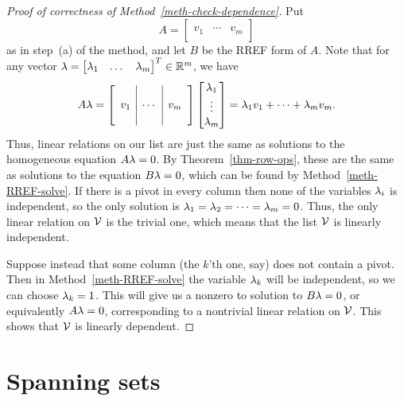 \documentclass[reqno]{amsart}
\theoremstyle{definition}
\begin{document}
\begin{proof}[Proof of correctness of Method~\ref{meth-check-dependence}]
 Put
 \[ A = \left[\begin{array}{c|c|c}
              && \\
              v_1 & \cdots & v_m \\
              &&
        \end{array}\right]
 \]
 as in step~(a) of the method, and let $B$ be the RREF form of $A$.
 Note that for any vector
 $\lambda=\left[\begin{matrix} \lambda_1 & \dotsc & \lambda_m\end{matrix}\right]^T\in{\mathbb{R}}^m$, we have
 \[ A\lambda =
     \left[\begin{array}{c|c|c}
              && \\
              v_1 & \cdots & v_m \\
              &&
     \end{array}\right]
     \left[\begin{matrix} \lambda_1 \\ \vdots \\ \lambda_m \end{matrix}\right] =
     \lambda_1v_1 + \dotsb + \lambda_mv_m.
 \]
 Thus, linear relations on our list are just the same as solutions to
 the homogeneous equation $A\lambda=0$.  By Theorem~\ref{thm-row-ops},
 these are the same as solutions to the equation $B\lambda=0$, which can
 be found by Method~\ref{meth-RREF-solve}.  If there is a pivot in
 every column then none of the variables $\lambda_i$ is independent, so
 the only solution is $\lambda_1=\lambda_2=\dotsb=\lambda_m=0$.  Thus, the only
 linear relation on $\mathcal{V}$ is the trivial one, which means that the
 list $\mathcal{V}$ is linearly independent.

 Suppose instead that some column (the $k$'th one, say) does not
 contain a pivot.  Then in Method~\ref{meth-RREF-solve} the variable
 $\lambda_k$ will be independent, so we can choose $\lambda_k=1$.  This will
 give us a nonzero to solution to $B\lambda=0$, or equivalently $A\lambda=0$,
 corresponding to a nontrivial linear relation on $\mathcal{V}$.  This shows
 that $\mathcal{V}$ is linearly dependent.
\end{proof}

\section{Spanning sets}
\label{sec-spanning}
\end{document}
